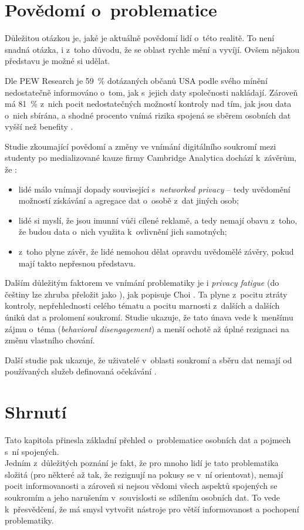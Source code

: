 \section{Povědomí o~problematice}

Důležitou otázkou je, jaké je aktuálně povědomí lidí o~této realitě. To není snadná otázka, i z~toho důvodu, že se oblast rychle mění a vyvíjí. Ovšem nějakou představu je možné si udělat.

Dle PEW Research je 59~\% dotázaných občanů USA podle svého mínění nedostatečně informováno o~tom, jak s~jejich daty společnosti nakládají.
Zároveň má 81~\% z~nich pocit nedostatečných možností kontroly nad tím, jak jsou data o~nich sbírána, a shodné procento vnímá rizika spojená se sběrem osobních dat vyšší než benefity \citep{lack-of-control}.

Studie zkoumající povědomí a změny ve vnímání digitálního soukromí mezi studenty po medializované kauze firmy Cambridge Analytica dochází k~závěrům, že \citep{privacy-awareness}:

\begin{itemize}
	\item lidé málo vnímají dopady související s~\textit{networked privacy} -- tedy uvědomění možností získávání a agregace dat o~osobě z~dat jiných osob;
	\item lidé si myslí, že jsou imunní vůči cílené reklamě, a tedy nemají obavu z~toho, že budou data o~nich využita k~ovlivnění jich samotných;
	\item z~toho plyne závěr, že lidé nemohou dělat opravdu uvědomělé závěry, pokud mají takto nepřesnou představu.
\end{itemize}

Dalším důležitým faktorem ve vnímání problematiky je i \textit{privacy fatigue} (do češtiny lze zhruba přeložit jako ), jak popisuje Choi \citep{privacy-fatigue}. Ta plyne z~pocitu ztráty kontroly, nepřehlednosti celého tématu a pocitu marnosti z~dalších a dalších úniků dat a prolomení soukromí. Studie ukazuje, že tato únava vede k~menšímu zájmu o~téma (\textit{behavioral disengagement}) a menší ochotě až úplné rezignaci na změnu vlastního chování.

Další studie pak ukazuje, že uživatelé v~oblasti soukromí a sběru dat nemají od používaných služeb definovaná očekávání \citep{user-privacy-expectations}.


\section*{Shrnutí}
Tato kapitola přinesla základní přehled o~problematice osobních dat a pojmech s~ní spojených.\\
Jedním z~důležitých poznání je fakt, že pro mnoho lidí je tato problematika složitá (pro některé až tak, že rezignují na pokusy se v~ní orientovat), nemají pocit informovanosti a zároveň si nejsou vědomi všech aspektů spojených se soukromím a jeho narušením v~souvislosti se sdílením osobních dat. To vede k~přesvědčení, že má smysl vytvořit nástroje pro větší informovanost a pochopení problematiky.